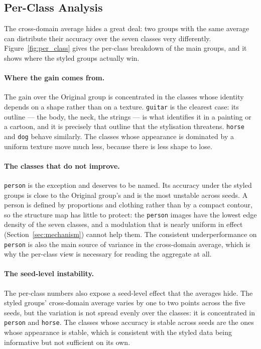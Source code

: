 \subsection{Per-Class Analysis}
\label{sec:per_class}

The cross-domain average hides a great deal: two groups with the same
average can distribute their accuracy over the seven classes very
differently. Figure~\ref{fig:per_class} gives the per-class breakdown of
the main groups, and it shows where the styled groups actually win.

\paragraph{Where the gain comes from.}
The gain over the Original group is concentrated in the classes whose
identity depends on a shape rather than on a texture. \texttt{guitar} is
the clearest case: its outline --- the body, the neck, the strings --- is
what identifies it in a painting or a cartoon, and it is precisely that
outline that the stylisation threatens. \texttt{horse} and \texttt{dog}
behave similarly. The classes whose appearance is dominated by a uniform
texture move much less, because there is less shape to lose.

\paragraph{The classes that do not improve.}
\texttt{person} is the exception and deserves to be named. Its accuracy
under the styled groups is close to the Original group's and is the most
unstable across seeds. A person is defined by proportions and clothing
rather than by a compact contour, so the structure map has little to
protect: the \texttt{person} images have the lowest edge density of the
seven classes, and a modulation that is nearly uniform in effect
(Section~\ref{sec:mechanism}) cannot help them. The consistent
underperformance on \texttt{person} is also the main source of variance in
the cross-domain average, which is why the per-class view is necessary for
reading the aggregate at all.

\paragraph{The seed-level instability.}
The per-class numbers also expose a seed-level effect that the averages
hide. The styled groups' cross-domain average varies by one to two points
across the five seeds, but the variation is not spread evenly over the
classes: it is concentrated in \texttt{person} and \texttt{horse}. The
classes whose accuracy is stable across seeds are the ones whose
appearance is stable, which is consistent with the styled data being
informative but not sufficient on its own.

